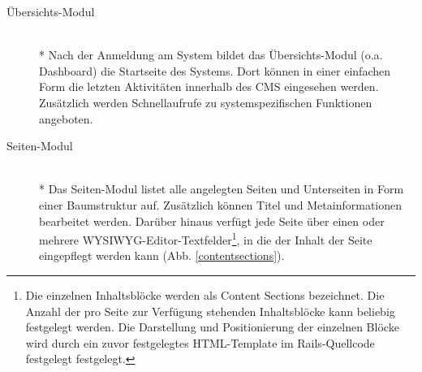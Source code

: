 \begin{description}
\item[Übersichts-Modul]\mbox{~}\\*
Nach der Anmeldung am System bildet das Übersichts-Modul (o.a. Dashboard) die Startseite des Systems. Dort können in einer einfachen Form die letzten Aktivitäten innerhalb des CMS eingesehen werden. Zusätzlich werden Schnellaufrufe zu systemspezifischen Funktionen angeboten.
\item[Seiten-Modul]\mbox{~}\\*
Das Seiten-Modul listet alle angelegten Seiten und Unterseiten in Form einer Baumstruktur auf. Zusätzlich können Titel und Metainformationen bearbeitet werden. Darüber hinaus verfügt jede Seite über einen oder mehrere WYSIWYG-Editor-Textfelder\footnote{Die einzelnen Inhaltsblöcke werden als Content Sections bezeichnet. Die Anzahl der pro Seite zur Verfügung stehenden Inhaltsblöcke kann beliebig festgelegt werden. Die Darstellung  und Positionierung der einzelnen Blöcke wird durch ein zuvor festgelegtes HTML-Template im Rails-Quellcode festgelegt festgelegt.}, in die der Inhalt der Seite eingepflegt werden kann (Abb. \ref{contentsections}).


\end{description}
